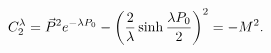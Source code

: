 \begin{equation}
C_2^{\lambda} = {\vec P}^2 e^{- \lambda P_0} -\left({2 \over \lambda} \sinh {\lambda P_0 \over 2} \right)^2 = -M^2.
\end{equation}

